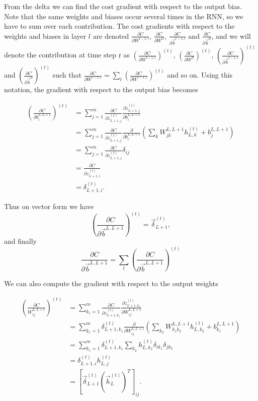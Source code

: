 \documentclass[11pt]{article}
\begin{document}
    From the delta we can find the cost gradient with respect to the output
bias. Note that the same weights and biases occur several times in the
RNN, so we have to sum over each contribution. The cost gradients with
respect to the weights and biases in layer \(l\) are denoted
\(\frac{\partial C}{\partial W^{l-1,l}}\),
\(\frac{\partial C}{\partial W^{ll}}\),
\(\frac{\partial C}{\partial \vec{b}^{l-1,l}}\) and
\(\frac{\partial C}{\partial \vec{b}^{ll}}\), and we will denote the
contribution at time step \(t\) as
\(\left(\frac{\partial C}{\partial W^{l-1,l}} \right)^{(t)}\),
\(\left( \frac{\partial C}{\partial W^{ll}} \right)^{(t)}\),
\(\left( \frac{\partial C}{\partial \vec{b}^{l-1,l}} \right)^{(t)}\) and
\(\left( \frac{\partial C}{\partial \vec{b}^{ll}} \right)^{(t)}\) such
that
\(\frac{\partial C}{\partial W^{l-1,l}} = \sum_t \left( \frac{\partial C}{\partial W^{l-1,l}}\right)^{(t)}\)
and so on. Using this notation, the gradient with respect to the output
bias becomes

\begin{align*}
\left( \frac{\partial C}{\partial b^{L,L+1}_i} \right)^{(t)} &= \sum_{j=1}^m \frac{\partial C}{\partial z_{L+1,j}^{(t)}} \frac{\partial z_{L+1,j}^{(t)}}{\partial b^{L,L+1}_i}
\\[4ex]
&= \sum_{j=1}^m \frac{\partial C}{\partial z_{L+1,j}^{(t)}} \frac{\partial}{\partial b^{L,L+1}_i} \left( \sum_k W^{L,L+1}_{jk} h_{L,k}^{(t)} + b^{L,L+1}_j \right)
\\[4ex]
&= \sum_{j=1}^m \frac{\partial C}{\partial z_{L+1,j}^{(t)}} \delta_{ij}
\\[4ex]
&= \frac{\partial C}{\partial z_{L+1,i}^{(t)}}
\\[4ex]
&= \delta_{L+1,i}^{(t)}.
\end{align*}

Thus on vector form we have
\[ \left( \frac{\partial C}{\partial \vec{b}^{L,L+1}} \right)^{(t)} = \vec{\delta}_{L+1}^{(t)},\]
and finally
\[\frac{\partial C}{\partial \vec{b}^{L,L+1}} = \sum_t \left( \frac{\partial C}{\partial \vec{b}^{L,L+1}} \right)^{(t)}\]

    We can also compute the gradient with respect to the output weights

\begin{align*}
\left( \frac{\partial C}{W^{L,L+1}_{ij}} \right)^{(t)} &= \sum_{k_1=1}^m \frac{\partial C}{\partial z_{L+1,k_1}^{(t)}} \frac{\partial z_{L+1,k_1}^{(t)}}{\partial W^{L,L+1}_{ij}}
\\[4ex]
&= \sum_{k_1=1}^m \delta_{L+1,k_1}^{(t)} \frac{\partial}{\partial W^{L,L+1}_{ij}}
\left( \sum_{k_2} W^{L,L+1}_{k_1 k_2} h_{L,k_2}^{(t)} + b^{L,L+1}_{k_1} \right)
\\[4ex]
&= \sum_{k_1=1}^m \delta_{L+1,k_1}^{(t)} \sum_{k_2} h_{L,k_2}^{(t)} \delta_{i k_1} \delta_{j k_2}
\\[4ex]
&= \delta_{L+1,i}^{(t)} h_{L,j}^{(t)}
\\[4ex]
&= \left[ \vec{\delta}_{L+1}^{(t)} \left(\vec{h}_{L}^{(t)}\right)^T \right]_{ij}.
\end{align*}
\end{document}
